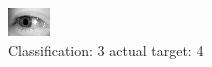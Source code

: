 \begin{figure}[h!]
\begin{center}
\includegraphics[width=0.60\columnwidth]{figures/ID3263_class_3_target_4.png}
\end{center}
\caption{ Classification: 3 actual target: 4}
\label{fig:ID3263_class_3_target_4}
\end{figure}
